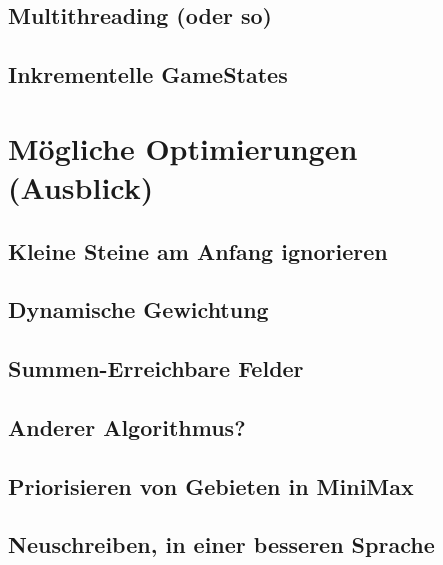 \documentclass[12pt, draft]{beamer}
\begin{document}
\subsection{Multithreading (oder so)} \begin{frame}\end{frame}
\subsection{Inkrementelle GameStates} \begin{frame}\end{frame}


\section{Mögliche Optimierungen (Ausblick)}
\subsection{Kleine Steine am Anfang ignorieren} \begin{frame}\end{frame}
\subsection{Dynamische Gewichtung} \begin{frame}\end{frame}
\subsection{Summen-Erreichbare Felder} \begin{frame}\end{frame}
\subsection{Anderer Algorithmus?} \begin{frame}\end{frame}
\subsection{Priorisieren von Gebieten in MiniMax} \begin{frame}\end{frame}
\subsection{Neuschreiben, in einer besseren Sprache} \begin{frame}\end{frame}
\end{document}
